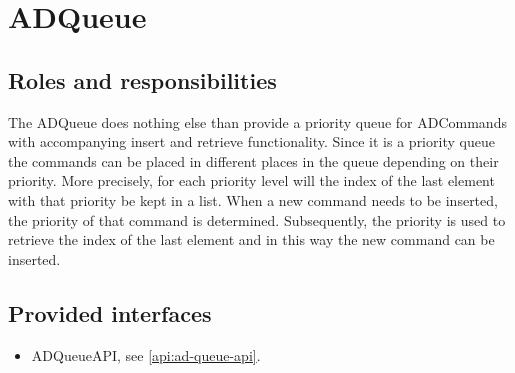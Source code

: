 \section{ADQueue}
\label{element:ad-queue}

\subsection{Roles and responsibilities}

\npar The ADQueue does nothing else than provide a priority queue for
ADCommands with accompanying insert and retrieve functionality. Since
it is a priority queue the commands can be placed in different places in the
queue depending on their priority. More precisely, for each priority level will
the index of the last element with that priority be kept in a list. When a new
command needs to be inserted, the priority of that command is determined.
Subsequently, the priority is used to retrieve the index of the last element and
in this way the new command can be inserted.

\subsection{Provided interfaces}

\begin{itemize}
  \item ADQueueAPI, see \ref{api:ad-queue-api}.
\end{itemize}